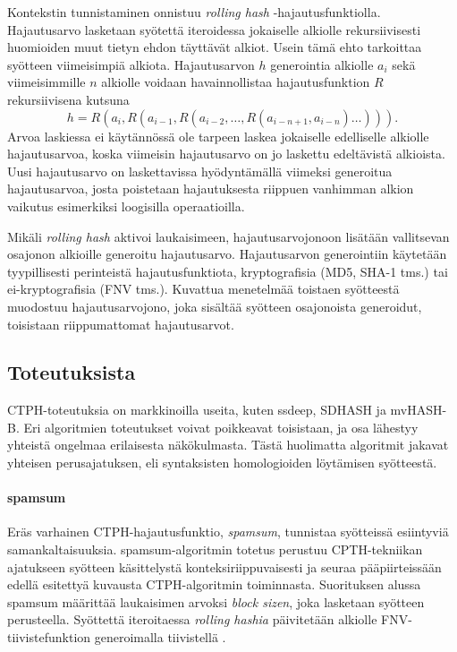 \documentclass[12pt, a4paper]{article}
\begin{document}
	Kontekstin tunnistaminen onnistuu \textit{rolling hash} -hajautusfunktiolla. Hajautusarvo
	lasketaan syötettä iteroidessa jokaiselle alkiolle rekursiivisesti huomioiden muut tietyn
	ehdon täyttävät alkiot. Usein tämä ehto tarkoittaa syötteen viimeisimpiä alkiota.
	Hajautusarvon $h$ generointia alkiolle $a_i$ sekä viimeisimmille $n$ alkiolle voidaan
	havainnollistaa hajautusfunktion $R$ rekursiivisena kutsuna 
	\[h = R(a_i, R(a_{i-1}, R(a_{i-2}, \ldots, R(a_{i - n + 1}, a_{i - n}) \ldots ))).\]
	Arvoa laskiessa ei käytännössä ole tarpeen laskea jokaiselle edelliselle alkiolle
	hajautusarvoa, koska viimeisin hajautusarvo on
	jo laskettu edeltävistä alkioista. Uusi hajautusarvo on laskettavissa
	hyödyntämällä viimeksi generoitua hajautusarvoa, josta poistetaan
	hajautuksesta riippuen vanhimman alkion vaikutus esimerkiksi loogisilla operaatioilla.

	Mikäli \textit{rolling hash} aktivoi laukaisimeen,
	hajautusarvojonoon lisätään vallitsevan osajonon
	alkioille generoitu hajautusarvo.
	Hajautusarvon generointiin käytetään tyypillisesti perinteistä
	hajautusfunktiota, kryptografisia (MD5, SHA-1 tms.) tai ei-kryptografisia (FNV tms.).
	Kuvattua menetelmää toistaen syötteestä muodostuu hajautusarvojono,
		joka sisältää syötteen osajonoista generoidut, toisistaan
		riippumattomat hajautusarvot.

	\subsection*{Toteutuksista}

	CTPH-toteutuksia on markkinoilla useita, kuten ssdeep, SDHASH ja mvHASH-B.
	Eri algoritmien toteutukset voivat poikkeavat toisistaan, ja osa lähestyy
	yhteistä ongelmaa erilaisesta näkökulmasta. Tästä huolimatta algoritmit
	jakavat yhteisen perusajatuksen, eli syntaksisten homologioiden löytämisen
	syötteestä.

	\paragraph{spamsum}
	Eräs varhainen CTPH-hajautusfunktio, \textit{spamsum}, tunnistaa
	syötteissä esiintyviä samankaltaisuuksia. spamsum-algoritmin
	totetus perustuu CPTH-tekniikan ajatukseen syötteen käsittelystä konteksiriippuvaisesti
	ja seuraa pääpiirteissään edellä esitettyä kuvausta CTPH-algoritmin toiminnasta.
	Suorituksen alussa spamsum määrittää laukaisimen arvoksi \textit{block sizen},
	joka lasketaan syötteen perusteella.
	Syöttettä iteroitaessa \textit{rolling hashia} päivitetään alkiolle FNV-tiivistefunktion
	generoimalla tiivistellä \parencite{IDENT}. 
\end{document}
